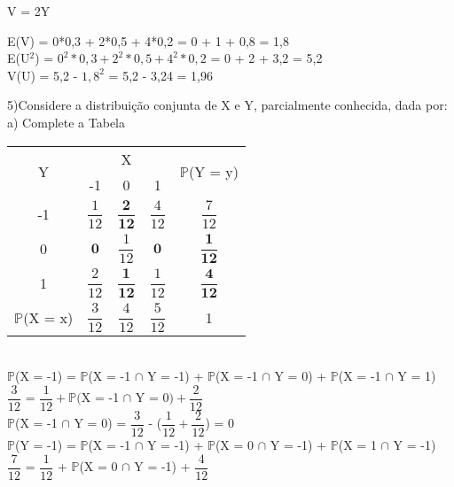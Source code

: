 \documentclass[12pt,a4paper,draft,final,oneside]{article}
\begin{document}
	V = 2Y
	\begin{center}
		\vspace{0.5cm}
		E(V) = 0*0,3 + 2*0,5 + 4*0,2 = 0 + 1 + 0,8 = 1,8
		\vspace{0.5cm}\\
		E(U$^2$) = $0^2*0,3 + 2^2*0,5 + 4^2*0,2$ = 0 + 2 + 3,2 = 5,2
		\vspace{0.5cm}\\
		V(U) = 5,2 - $1,8^2$ = 5,2 - 3,24 = 1,96
	\end{center}
	\vspace{1cm}
	5)Considere a distribuição conjunta de X e Y, parcialmente conhecida, dada por:\\
	a) Complete a Tabela
	\begin{center}
		\begin{tabular}{|c|c|c|c|c|} \hline
			\multirow{2}{*}{Y} & \multicolumn{3}{|c|}{X} & \multirow{2}{*}{$\mathbb{P}$(Y = y)}\\ \cline{2-4}
			& -1 & 0 & 1 &\\ \hline
			-1 & $\dfrac{1}{12}$ & $\mathbf{\dfrac{2}{12}}$ & $\dfrac{4}{12}$ & $\dfrac{7}{12}$\\ \hline
			0 & $\mathbf{0}$ & $\dfrac{1}{12}$ & $\mathbf{0}$ & $\mathbf{\dfrac{1}{12}}$\\ \hline
			1 & $\dfrac{2}{12}$ & $\mathbf{\dfrac{1}{12}}$ & $\dfrac{1}{12}$ & $\mathbf{\dfrac{4}{12}}$\\ \hline
			$\mathbb{P}$(X = x) & $\dfrac{3}{12}$ & $\dfrac{4}{12}$ & $\dfrac{5}{12}$ & 1\\ \hline
		\end{tabular}
	\vspace{1cm}\\
	$\mathbb{P}$(X = -1) = $\mathbb{P}$(X = -1 $\cap$ Y = -1) + $\mathbb{P}$(X = -1 $\cap$ Y = 0) + $\mathbb{P}$(X = -1 $\cap$ Y = 1)
	\vspace{0.25cm}\\
	$\dfrac{3}{12}$ = $\dfrac{1}{12} + \mathbb{P}($X = -1 $\cap$ Y = 0$) + \dfrac{2}{12}$
	\vspace{0.25cm}\\
	$\mathbb{P}$(X = -1 $\cap$ Y = 0) = $\dfrac{3}{12}$ - ($\dfrac{1}{12} + \dfrac{2}{12}$) = 0
	\vspace{1cm}\\
	$\mathbb{P}$(Y = -1) = $\mathbb{P}$(X = -1 $\cap$ Y = -1) + $\mathbb{P}$(X = 0 $\cap$ Y = -1) + $\mathbb{P}$(X = 1 $\cap$ Y = -1)
	\vspace{0.25cm}\\
	$\dfrac{7}{12}$ = $\dfrac{1}{12}$ + $\mathbb{P}$(X = 0 $\cap$ Y = -1) + $\dfrac{4}{12}$

\end{center}
\end{document}

